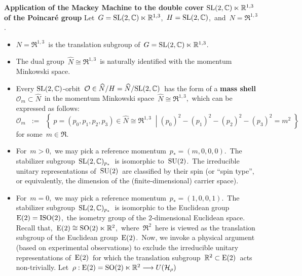 
\vskip 0.5cm
\noindent
\textbf{Application of the Mackey Machine to the double cover $\SL(2,\C)\ltimes\Re^{1,3}$ of the Poincaré group}
\vskip 0.3cm
\noindent
Let
\,$G = \SL(2,\C)\ltimes\Re^{1,3}$,
\,$H = \SL(2,\C)$,\, and \,$N = \Re^{1,3}$.\,
\begin{itemize}
\item
	$N = \Re^{1,3}$\, is the translation subgroup of
	\,$G = \SL(2,\C)\ltimes\Re^{1,3}$.\,
\item
	The dual group
	\,$\widehat{N} \cong \Re^{1,3}$\,
	is naturally identified with the momentum Minkowski space.
\item
	Every $\SL(2,\C)$-orbit \,$\mathcal{O} \in \widehat{N}/H = \widehat{N}/\SL(2,\C)$\,
	has the form of a \textbf{mass shell}
	\,$\mathcal{O}_{m} \subset \widehat{N}$\,
	in the momentum Minkowski space
	\,$\widehat{N}\cong\Re^{1,3}$,\,
	which can be expressed as follows:
	\begin{equation*}
	\mathcal{O}_{m}
	\;\; := \;\;
		\left\{\;
			\left.
			p = (p_{0},p_{1},p_{2},p_{3}) \in \widehat{N} \cong \Re^{1,3}
			\;\;\right\vert\;
			(p_{0})^{2} - (p_{1})^{2} - (p_{2})^{2} - (p_{3})^{2} = m^{2}
			\;\right\}
	\end{equation*}
	for some \,$m \in \Re$.\,
\item
	For \,$m > 0$,\, we may pick a reference momentum \,$p_{*} = (m,0,0,0)$.\,
	The stabilizer subgroup
	\,$\SL(2,\C)_{p_{*}}$\, is isomorphic to \,$\SU(2)$.\,
	The irreducible unitary representations of \,$\SU(2)$\,
	are classified by their spin (or ``spin type'', or equivalently,
	the dimension of the (finite-dimensional) carrier space).
\item
	For \,$m = 0$,\, we may pick a reference momentum \,$p_{*} = (1,0,0,1)$.\,
	The stabilizer subgroup
	\,$\SL(2,\C)_{p_{*}}$\, is isomorphic to the Euclidean group
	\,$\textnormal{E}(2) = \textnormal{ISO}(2)$,\,
	the isometry group of the $2$-dimensional Euclidean space.
	\vskip 0.2cm
	Recall that, \,$\textnormal{E}(2) \cong \SO(2) \ltimes \Re^{2}$,\,
	where \,$\Re^{2}$\, here is viewed as the translation subgroup
	of the Euclidean group \,$\textnormal{E}(2)$.\,
	\vskip 0.2cm
	Now, we invoke a physical argument (based on experimental observations)
	to exclude the irreducible unitary representations of
	\,$\textnormal{E}(2)$\,
	for which the translation subgroup
	\,$\Re^{2} \subset \textnormal{E}(2)$\,
	acts non-trivially.
	Let
	\,$\rho : \textnormal{E}(2) = \SO(2) \ltimes \Re^{2} \longrightarrow U(\mathcal{H}_{\rho})$\,

\end{itemize}
